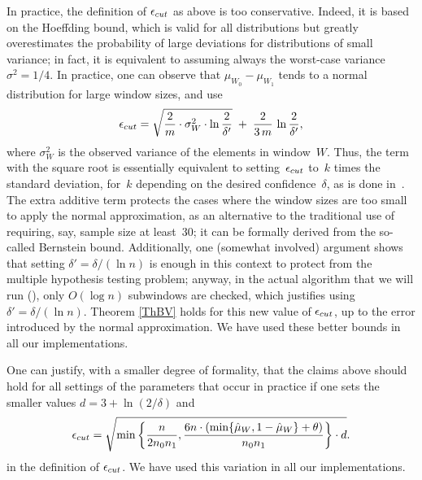 \noindent



In practice, the definition of $\epsilon_{cut}$ as above is too conservative. 
Indeed, it is based on the Hoeffding bound, 
which is valid for all distributions but greatly overestimates the
probability of large deviations for distributions of small variance;
in fact, it is equivalent to assuming always the worst-case variance
$\sigma^2=1/4$. 
In practice, one can observe that 
$\mu_{W_0}-\mu_{W_1}$ tends to a normal distribution
for large window sizes, and use 
%
\begin{equation}
\label{Enewepsilon}
\epsilon_{cut}= \sqrt{\frac{2}{m} \cdot \sigma^2_W  \cdot \ln\frac{2}{\delta'} }
       \; + \; \frac{2}{3\,m} \, \ln\frac{2}{\delta'},
\end{equation}
%
where $\sigma^2_W$ is the observed variance of the elements in window~$W$. 
Thus, the term with the square root is essentially equivalent 
to setting~$\epsilon_{cut}$ to~$k$ times the standard deviation, for~$k$ depending
on the desired confidence~$\delta$, as is done in~\cite{Gama}. 
The extra additive term protects the
cases where the window sizes are too small to apply the normal approximation, 
as an alternative to the traditional use of requiring, say, 
sample size at least~$30$; 
it can be formally derived from the so-called Bernstein bound. 
Additionally, one (somewhat involved) argument shows that 
setting $\delta'=\delta/(\ln n)$ is enough in this context 
to protect from the multiple hypothesis testing problem; anyway, 
in the actual algorithm that we will run (\adwintwoz), 
only $O(\log n)$ subwindows are checked, 
which justifies using  $\delta'=\delta/(\ln n)$. %
Theorem \ref{ThBV} holds for this new value of $\epsilon_{cut}$, 
up to the error introduced by the normal approximation.
We have used these better bounds in all our implementations. 

\BEGINOMIT
One can justify, with a smaller degree of formality,
that the claims above should hold for all settings of the 
parameters that occur in practice if one sets the smaller values
$d=3+\ln(2/\delta)$ and 
$$
\epsilon_{cut}= \sqrt{\min\left\{{n \over 2 n_0 n_1},
             \frac{6 n \cdot (\min\{\hat{\mu}_W,1-\hat{\mu}_W\} + \theta)}{n_0 n_1} \right\}
             \cdot d}.
$$
in the definition of $\epsilon_{cut}$. 
We have used this variation in all our implementations.
\ENDOMIT 


